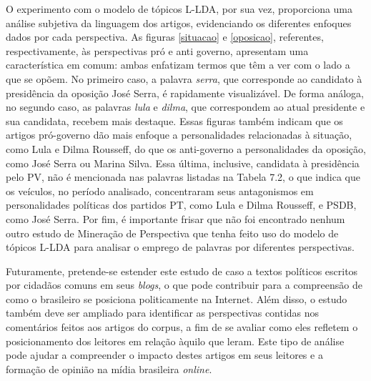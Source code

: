 
O experimento com o modelo de tópicos L-LDA, por sua vez, proporciona uma análise subjetiva da linguagem dos artigos, evidenciando os diferentes enfoques dados por cada perspectiva. As figuras \ref{situacao} e \ref{oposicao}, referentes, respectivamente, às perspectivas pró e anti governo, apresentam uma característica em comum: ambas enfatizam termos que têm a ver com o lado a que se opõem. No primeiro caso, a palavra \emph{serra}, que corresponde ao candidato à presidência da oposição José Serra, é rapidamente visualizável. De forma análoga, no segundo caso, as palavras \emph{lula} e \emph{dilma}, que correspondem ao atual presidente e sua candidata, recebem mais destaque. Essas figuras também indicam que os artigos pró-governo dão mais enfoque a personalidades relacionadas à situação, como Lula e Dilma Rousseff, do que os anti-governo a personalidades da oposição, como José Serra ou Marina Silva. Essa última, inclusive, candidata à presidência pelo PV, não é mencionada nas palavras listadas na Tabela 7.2, o que indica que os veículos, no período analisado, concentraram seus antagonismos em personalidades políticas dos partidos PT, como Lula e Dilma Rousseff, e PSDB, como José Serra. Por fim, é importante frisar que não foi encontrado nenhum outro estudo de Mineração de Perspectiva que tenha feito uso do modelo de tópicos L-LDA para analisar o emprego de palavras por diferentes perspectivas.


Futuramente, pretende-se estender este estudo de caso a textos políticos escritos por cidadãos comuns em seus \emph{blogs}, o que pode contribuir para a compreensão de como o brasileiro se posiciona politicamente na Internet. Além disso, o estudo também deve ser ampliado para identificar as perspectivas contidas nos comentários feitos aos artigos do corpus, a fim de se avaliar como eles refletem o posicionamento dos leitores em relação àquilo que leram. Este tipo de análise pode ajudar a compreender o impacto destes artigos em seus leitores e a formação de opinião na mídia brasileira \emph{online}.

